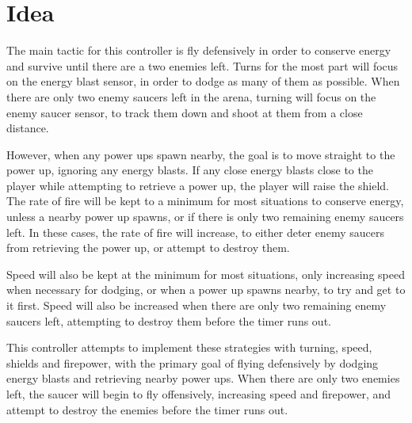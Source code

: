 \section{Idea}

The main tactic for this controller is fly defensively in order to conserve energy and survive until there are a two enemies left. Turns for the most part will focus on the energy blast sensor, in order to dodge as many of them as possible. When there are only two enemy saucers left in the arena, turning will focus on the enemy saucer sensor, to track them down and shoot at them from a close distance.

However, when any power ups spawn nearby, the goal is to move straight to the power up, ignoring any energy blasts. If any close energy blasts close to the player while attempting to retrieve a power up, the player will raise the shield. The rate of fire will be kept to a minimum for most situations to conserve energy, unless a nearby power up spawns, or if there is only two remaining enemy saucers left. In these cases, the rate of fire will increase, to either deter enemy saucers from retrieving the power up, or attempt to destroy them.

Speed will also be kept at the minimum for most situations, only increasing speed when necessary for dodging, or when a power up spawns nearby, to try and get to it first. Speed will also be increased when there are only two remaining enemy saucers left, attempting to destroy them before the timer runs out.

This controller attempts to implement these strategies with turning, speed, shields and firepower, with the primary goal of flying defensively by dodging energy blasts and retrieving nearby power ups. When there are only two enemies left, the saucer will begin to fly offensively, increasing speed and firepower, and attempt to destroy the enemies before the timer runs out.